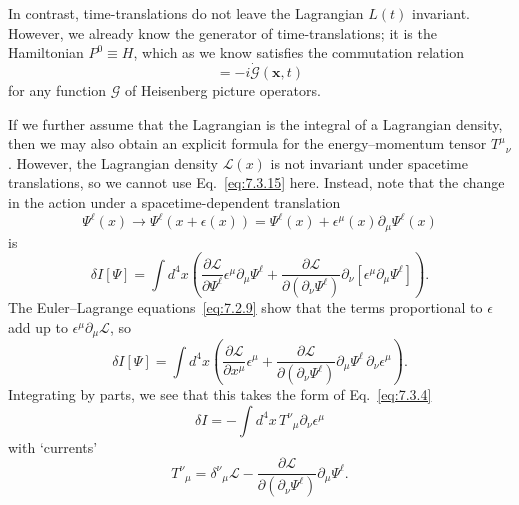 In contrast, time-translations do not leave the Lagrangian $L(t)$ invariant.
However, we already know the generator of time-translations; it is the
Hamiltonian $P^0\equiv H$, which as we know satisfies the commutation relation
\begin{equation}
[H,\mathcal{G}(\mathbf{x},t)]=-i\dot{\mathcal{G}}(\mathbf{x},t)
\tag{7.3.29}\label{eq:7.3.29}
\end{equation}
for any function $\mathcal{G}$ of Heisenberg picture operators.

If we further assume that the Lagrangian is the integral of a Lagrangian
density, then we may also obtain an explicit formula for the energy--momentum
tensor $T^\mu{}_\nu$. However, the Lagrangian density $\mathcal{L}(x)$ is not
invariant under spacetime translations, so we cannot use Eq.~\eqref{eq:7.3.15} here.
Instead, note that the change in the action under a spacetime-dependent
translation
\begin{equation}
\Psi^\ell(x)\longrightarrow\Psi^\ell(x+\epsilon(x))
=\Psi^\ell(x)+\epsilon^\mu(x)\partial_\mu\Psi^\ell(x)
\tag{7.3.30}\label{eq:7.3.30}
\end{equation}
is
\begin{equation}
\delta I[\Psi]=\int d^4x\left(
\frac{\partial\mathcal{L}}{\partial\Psi^\ell}\epsilon^\mu\partial_\mu\Psi^\ell
+\frac{\partial\mathcal{L}}{\partial(\partial_\nu\Psi^\ell)}
\partial_\nu[\epsilon^\mu\partial_\mu\Psi^\ell]\right).
\tag{7.3.31}\label{eq:7.3.31}
\end{equation}
The Euler--Lagrange equations~\eqref{eq:7.2.9} show that the terms proportional to
$\epsilon$ add up to $\epsilon^\mu\partial_\mu\mathcal{L}$, so
\begin{equation}
\delta I[\Psi]=\int d^4x\left(
\frac{\partial\mathcal{L}}{\partial x^\mu}\epsilon^\mu
+\frac{\partial\mathcal{L}}{\partial(\partial_\nu\Psi^\ell)}
\partial_\mu\Psi^\ell\,\partial_\nu\epsilon^\mu\right).
\tag{7.3.32}\label{eq:7.3.32}
\end{equation}
Integrating by parts, we see that this takes the form of Eq.~\eqref{eq:7.3.4}
\begin{equation}
\delta I=-\int d^4x\,T^\nu{}_\mu\partial_\nu\epsilon^\mu
\tag{7.3.33}\label{eq:7.3.33}
\end{equation}
with `currents'
\begin{equation}
T^\nu{}_\mu=\delta^\nu{}_\mu\mathcal{L}
-\frac{\partial\mathcal{L}}{\partial(\partial_\nu\Psi^\ell)}
\partial_\mu\Psi^\ell.
\tag{7.3.34}\label{eq:7.3.34}
\end{equation}
